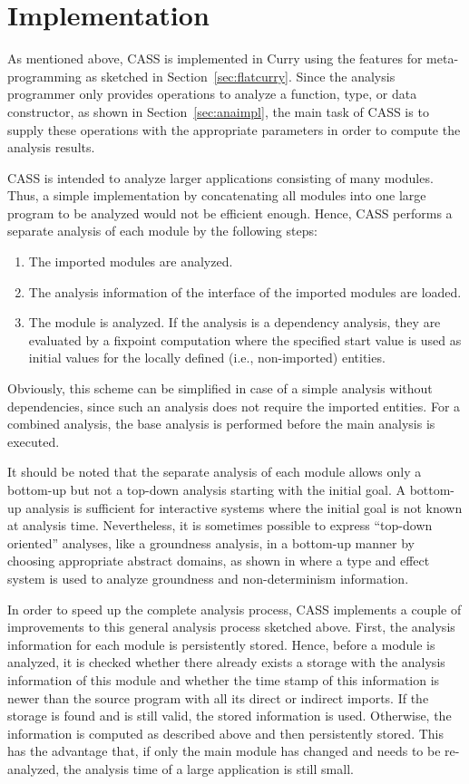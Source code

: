 \documentclass{llncs}
\begin{document}
\section{Implementation}
\label{sec:impl}

As mentioned above, CASS is implemented in Curry using the
features for meta-programming as sketched in
Section~\ref{sec:flatcurry}.
Since the analysis programmer only provides operations
to analyze a function, type, or data constructor,
as shown in Section~\ref{sec:anaimpl},
the main task of CASS is to supply these operations with
the appropriate parameters in order to compute the analysis
results.

CASS is intended to analyze larger applications consisting of
many modules. Thus, a simple implementation by concatenating
all modules into one large program to be analyzed would not
be efficient enough.
Hence, CASS performs a separate analysis of each module
by the following steps:
\begin{enumerate}
\item The imported modules are analyzed.
\item The analysis information of the interface of the imported modules
are loaded.
\item The module is analyzed. If the analysis is a dependency analysis,
they are evaluated by a fixpoint computation where the specified start
value is used as initial values for the locally defined (i.e., non-imported)
entities.
\end{enumerate}
Obviously, this scheme can be simplified in case of a simple
analysis without dependencies, since such an analysis does not require
the imported entities.
For a combined analysis, the base analysis is performed
before the main analysis is executed.

It should be noted that the separate analysis of each module
allows only a bottom-up but not a top-down analysis starting with the initial
goal. A bottom-up analysis is sufficient for interactive systems where the 
initial goal is not known at analysis time.
Nevertheless, it is sometimes possible to express ``top-down oriented''
analyses, like a groundness analysis, in a bottom-up manner
by choosing appropriate abstract domains, as shown in
\cite{BrasselHanus05} where a type and effect system is used
to analyze groundness and non-determinism information.

In order to speed up the complete analysis process,
CASS implements a couple of improvements to this general analysis
process sketched above.
First, the analysis information for each module is persistently stored.
Hence, before a module is analyzed, it is checked whether
there already exists a storage with the analysis information
of this module and whether the time stamp of this information is newer
than the source program with all its direct or indirect imports.
If the storage is found and is still valid, the stored information is used.
Otherwise, the information is computed as described above
and then persistently stored.
This has the advantage that, if only the main module has changed and needs to be
re-analyzed, the analysis time of a large application is still small.
\end{document}
